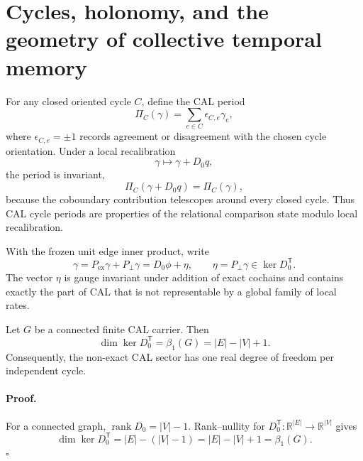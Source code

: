 
\section{Cycles, holonomy, and the geometry of collective temporal memory}
\label{sec:memory}

For any closed oriented cycle $C$, define the CAL period
\begin{equation}
\Pi_C(\gamma)=\sum_{e\in C}\epsilon_{C,e}\gamma_e,
\label{eq:cycle-period}
\end{equation}
where $\epsilon_{C,e}=\pm1$ records agreement or disagreement with the chosen cycle orientation. Under a local recalibration
\begin{equation}
\gamma\longmapsto\gamma+D_0q,
\end{equation}
the period is invariant,
\begin{equation}
\Pi_C(\gamma+D_0q)=\Pi_C(\gamma),
\end{equation}
because the coboundary contribution telescopes around every closed cycle. Thus CAL cycle periods are properties of the relational comparison state modulo local recalibration.

With the frozen unit edge inner product, write
\begin{equation}
\gamma=P_{\mathrm{ex}}\gamma+P_\perp\gamma
      =D_0\phi+\eta,
\qquad
\eta=P_\perp\gamma\in\ker D_0^{\mathsf T}.
\label{eq:hodge-memory-decomposition}
\end{equation}
The vector $\eta$ is gauge invariant under addition of exact cochains and contains exactly the part of CAL that is not representable by a global family of local rates.

\begin{proposition}
\label{prop:memory-dimension}
Let $G$ be a connected finite CAL carrier. Then
\begin{equation}
\dim\ker D_0^{\mathsf T}=\beta_1(G)=|E|-|V|+1.
\label{eq:memory-dimension}
\end{equation}
Consequently, the non-exact CAL sector has one real degree of freedom per independent cycle.
\end{proposition}

\paragraph*{Proof.}
For a connected graph, $\operatorname{rank}D_0=|V|-1$. Rank--nullity for $D_0^{\mathsf T}:\mathbb R^{|E|}\to\mathbb R^{|V|}$ gives
\begin{equation}
\dim\ker D_0^{\mathsf T}=|E|-(|V|-1)=|E|-|V|+1=\beta_1(G).
\end{equation}
\hfill$\square$


